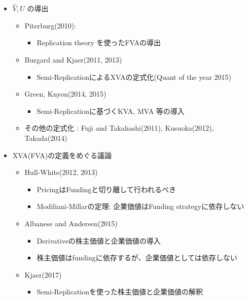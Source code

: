 \documentclass[driverfallback=dvipdfmx,cjk]{beamer}
\begin{document}
\begin{frame}
    \begin{itemize}
        \item $\hat{V}, U$ の導出
        \begin{itemize}
            \item Piterburg(2010):
           \begin{itemize}
               \item Replication theory を使ったFVAの導出
           \end{itemize} 
            \item Burgard and Kjaer(2011,  2013)
            \begin{itemize}
                \item Semi-ReplicationによるXVAの定式化(Quant of the year 2015)
            \end{itemize}
            \item Green, Knyon(2014, 2015)
            \begin{itemize}
                \item Semi-Replicationに基づくKVA, MVA 等の導入
            \end{itemize}
            
            \item その他の定式化 : Fuji and Takahashi(2011), Kusuoka(2012), Takada(2014)
        \end{itemize}
        \item XVA(FVA)の定義をめぐる議論
        \begin{itemize}
            \item Hull-White(2012, 2013)
            \begin{itemize}
                \item PricingはFundingと切り離して行われるべき
                \item Modiliani-Millarの定理: 企業価値はFunding strategyに依存しない 
            \end{itemize}
            
            \item Albanese and Andersen(2015)
            \begin{itemize}
                \item Derivativeの株主価値と企業価値の導入
                \item 株主価値はfundingに依存するが、企業価値としては依存しない
            \end{itemize}
            \item Kjaer(2017) 
            \begin{itemize}
                \item Semi-Replicationを使った株主価値と企業価値の解釈
            \end{itemize}
        \end{itemize}
    \end{itemize}
\end{frame}
\end{document}
